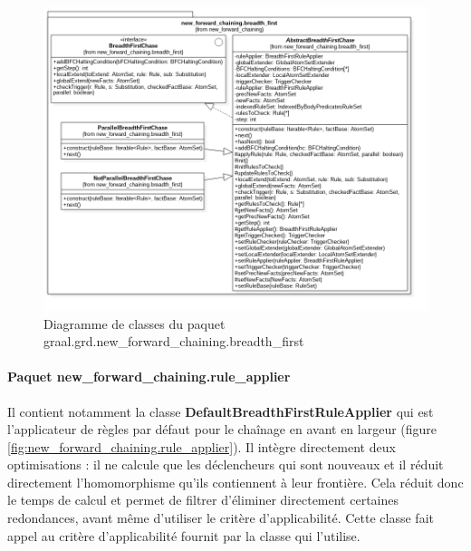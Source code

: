        \begin{figure}[h]
        \centering
        \includegraphics[width=\textwidth]{pictures/new_forward_chaining-breadth_first.png}
        \vspace{-35pt}
        \caption{Diagramme de classes du paquet graal.grd.new\_forward\_chaining.breadth\_first}
        \label{fig:new_forward_chaining.breadth_first}
        \vspace{-10pt}
        \end{figure}
        
       \paragraph{Paquet new\_forward\_chaining.rule\_applier} Il contient notamment la classe \textbf{DefaultBreadthFirstRuleApplier} qui est l'applicateur de règles par défaut pour le chaînage en avant en largeur (figure \ref{fig:new_forward_chaining.rule_applier}). Il intègre directement deux optimisations : il ne calcule que les déclencheurs qui sont nouveaux et il réduit directement l'homomorphisme qu'ils contiennent à leur frontière. Cela réduit donc le temps de calcul et permet de filtrer d'éliminer directement certaines redondances, avant même d'utiliser le critère d'applicabilité. Cette classe fait appel au critère d'applicabilité fournit par la classe qui l'utilise.
       
